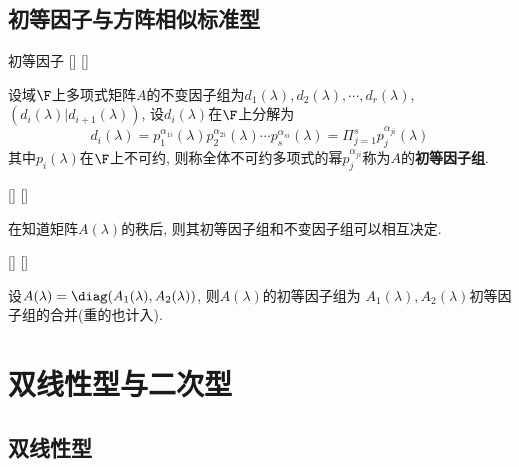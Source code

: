 \documentclass[UTF8]{ctexart}
\begin{document}
        
    \subsection{初等因子与方阵相似标准型}

        \begin{dfn}
			[]
			{初等因子}
			[]
			[]
        
            设域$\F$上多项式矩阵$A$的不变因子组为$d_1(\lambda),d_2(\lambda),\cdots,d_r(\lambda)$, $(d_i(\lambda)|d_{i+1}(\lambda))$, 设$d_i(\lambda)$在$\F$上分解为
            \[d_i(\lambda)=p_1^{\alpha_{1i}}(\lambda)p_2^{\alpha_{2i}}(\lambda)\cdots p_s^{\alpha _{si}}(\lambda)=\Pi_{j=1}^sp_{j}^{\alpha_{ji}}(\lambda)\]
            其中$p_i(\lambda)$在$\F$上不可约, 则称全体不可约多项式的幂$p_j^{\alpha_{ji}}$称为$A$的\textbf{初等因子组}.
        \end{dfn}

        \begin{lma}
			[]
			{}
			[]
			[]
			
            在知道矩阵$A(\lambda)$的秩后, 则其初等因子组和不变因子组可以相互决定.
        \end{lma}

        \begin{prf}
            
        \end{prf}

        \begin{lma}
			[]
			{}
			[]
			[]
			
            设$A(\lambda)=\diag(A_1(\lambda),A_2(\lambda))$, 则$A(\lambda)$的初等因子组为
            $A_1(\lambda),A_2(\lambda)$初等因子组的合并(重的也计入).
        \end{lma}

\section{双线性型与二次型}

	\subsection{双线性型}
\end{document}
